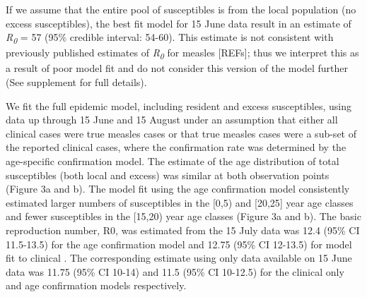 If we assume that the entire pool of susceptibles is from the local population (no excess susceptibles), the best
fit model for 15 June data result in an estimate of
\emph{R\textsubscript{0}} = 57 (95\% credible interval: 54-60). This
estimate is not consistent with previously published estimates of
\emph{R\textsubscript{0}} for measles {[}REFs{]}; thus we interpret this
as a result of poor model fit and do not consider this version of the
model further (See supplement for full details).

We fit the full epidemic model, including resident and excess
susceptibles, using data up through 15 June and 15 August under an
assumption that either all clinical cases were true measles cases or
that true measles cases were a sub-set of the reported clinical cases,
where the confirmation rate was determined by the age-specific
confirmation model. The estimate of the age distribution of total
susceptibles (both local and excess) was similar at both observation
points (Figure 3a and b). The model fit using the age confirmation model
consistently estimated larger numbers of susceptibles in the {[}0,5) and
{[}20,25{]} year age classes and fewer susceptibles in the {[}15,20)
year age classes (Figure 3a and b). The basic reproduction number, R0,
was estimated from the 15 July data was 12.4 (95\% CI 11.5-13.5) for the
age confirmation model and 12.75 (95\% CI 12-13.5) for model fit to
clinical . The corresponding estimate using only data available on 15
June data was 11.75 (95\% CI 10-14) and 11.5 (95\% CI 10-12.5) for the
clinical only and age confirmation models respectively.